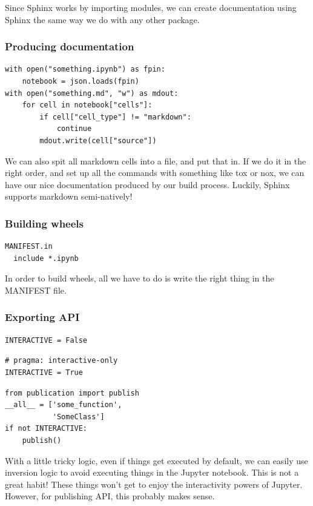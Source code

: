 Since Sphinx works by importing modules,
we can create documentation using Sphinx the same
way we do with any other package.

\begin{frame}[fragile]
\frametitle{Producing documentation}

\begin{lstlisting}
with open("something.ipynb") as fpin:
    notebook = json.loads(fpin)
with open("something.md", "w") as mdout:
    for cell in notebook["cells"]:
        if cell["cell_type"] != "markdown":
            continue
        mdout.write(cell["source"])
\end{lstlisting}

\end{frame}

We can also spit all markdown cells into a file,
and put that in.
If we do it in the right order,
and set up all the commands with something like
tox or nox,
we can have our nice documentation produced by our build process.
Luckily,
Sphinx supports markdown semi-natively!


\begin{frame}[fragile]
\frametitle{Building wheels}

\begin{lstlisting}
MANIFEST.in
  include *.ipynb
\end{lstlisting}

\end{frame}

In order to build wheels,
all we have to do is write the right thing in the MANIFEST file.

\begin{frame}[fragile]
\frametitle{Exporting API}

\begin{lstlisting}[frame=single]
INTERACTIVE = False
\end{lstlisting}

\begin{lstlisting}[frame=single]
# pragma: interactive-only 
INTERACTIVE = True
\end{lstlisting}

\begin{lstlisting}[frame=single]
from publication import publish
__all__ = ['some_function',
           'SomeClass']
if not INTERACTIVE:
    publish()
\end{lstlisting}

\end{frame}

With a little tricky logic,
even if things get executed by default,
we can easily use inversion logic to avoid executing things
in the Jupyter notebook.
This is not a great habit!
These things won't get to enjoy the interactivity powers of Jupyter.
However,
for publishing API,
this probably makes sense.


